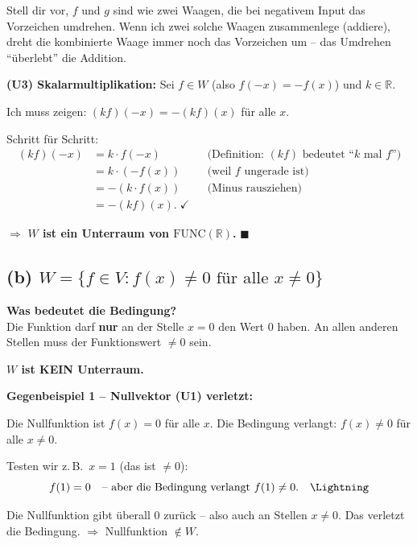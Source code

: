 \documentclass[a4paper,12pt]{article}
\begin{document}
\begin{analogie}
Stell dir vor, $f$ und $g$ sind wie zwei Waagen, die bei negativem Input das Vorzeichen umdrehen. Wenn ich zwei solche Waagen zusammenlege (addiere), dreht die kombinierte Waage immer noch das Vorzeichen um -- das Umdrehen ``\"uberlebt'' die Addition.
\end{analogie}

\textbf{(U3) Skalarmultiplikation:}
Sei $f \in W$ (also $f(-x) = -f(x)$) und $k \in \mathbb{R}$.

Ich muss zeigen: $(kf)(-x) = -(kf)(x)$ f\"ur alle $x$.

Schritt f\"ur Schritt:
\begin{align*}
(kf)(-x) &= k \cdot f(-x)
    && \text{(Definition: $(kf)$ bedeutet ``$k$ mal $f$'')} \\
  &= k \cdot (-f(x))
    && \text{(weil $f$ ungerade ist)} \\
  &= -(k \cdot f(x))
    && \text{(Minus rausziehen)} \\
  &= -(kf)(x). \;\checkmark
\end{align*}

$\Rightarrow$ \textbf{$W$ ist ein Unterraum von $\mathrm{FUNC}(\mathbb{R})$.} \hfill $\blacksquare$

\subsection*{(b) \quad $W = \{f \in V : f(x) \neq 0 \text{ f\"ur alle } x \neq 0\}$}

\textbf{Was bedeutet die Bedingung?}\\
Die Funktion darf \textbf{nur} an der Stelle $x = 0$ den Wert $0$ haben. An allen anderen Stellen muss der Funktionswert $\neq 0$ sein.

\textbf{$W$ ist KEIN Unterraum.}

\medskip
\textbf{Gegenbeispiel 1 -- Nullvektor (U1) verletzt:}

Die Nullfunktion ist $f(x) = 0$ f\"ur alle $x$.
Die Bedingung verlangt: $f(x) \neq 0$ f\"ur alle $x \neq 0$.

Testen wir z.\,B.\ $x = 1$ (das ist $\neq 0$):
\[
f(1) = 0 \quad \text{-- aber die Bedingung verlangt } f(1) \neq 0. \quad \Lightning
\]

Die Nullfunktion gibt \"uberall $0$ zur\"uck -- also auch an Stellen $x \neq 0$.
Das verletzt die Bedingung. $\Rightarrow$ Nullfunktion $\notin W$.
\end{document}
